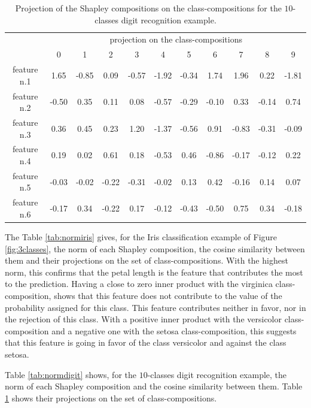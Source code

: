 \documentclass{article}
\theoremstyle{plain}
\theoremstyle{definition}
\theoremstyle{remark}
\begin{document}
\begin{table}
  \centering
  \caption{Projection of the Shapley compositions on the class-compositions for the $10$-classes digit recognition example.}
  \begin{tabular}{c|cccccccccc|}
    \cline{2-11}
    & \multicolumn{10}{c|}{projection on the class-compositions} \\
    \cline{2-11}
    & 0 & 1 & 2 & 3 & 4 & 5 & 6 & 7 & 8 & 9 \\
    \hline
    \small feature n.1 & 1.65 & -0.85 & 0.09 & -0.57 & -1.92 & -0.34 & 1.74 & 1.96 & 0.22 & -1.81 \\
    \small feature n.2 & -0.50 & 0.35 & 0.11 & 0.08 & -0.57 & -0.29 & -0.10 & 0.33 & -0.14 & 0.74\\
    \small feature n.3 & 0.36 & 0.45 & 0.23 & 1.20 & -1.37 & -0.56 & 0.91 & -0.83 & -0.31 & -0.09 \\
    \small feature n.4 & 0.19 & 0.02 & 0.61 & 0.18 & -0.53 & 0.46 & -0.86 & -0.17 & -0.12 & 0.22 \\
    \small feature n.5 & -0.03 & -0.02 & -0.22 & -0.31 & -0.02 & 0.13 & 0.42 & -0.16& 0.14 & 0.07 \\
    \small feature n.6 & -0.17 & 0.34 & -0.22 & 0.17 & -0.12 & -0.43 &-0.50  & 0.75 & 0.34 & -0.18 \\
    \hline
  \end{tabular}
  \label{tab:projdigit}
\end{table}
The Table \ref{tab:normiris} gives, for the Iris classification example of Figure \ref{fig:3classes}, the norm of each Shapley composition, the cosine similarity between them and their projections on the set of class-compositions. With the highest norm, this confirms that the petal length is the feature that contributes the most to the prediction. Having a close to zero inner product with the virginica class-composition, shows that this feature does not contribute to the value of the probability assigned for this class. This feature contributes neither in favor, nor in the rejection of this class. With a positive inner product with the versicolor class-composition and a negative one with the setosa class-composition, this suggests that this feature is going in favor of the class versicolor and against the class setosa.

Table \ref{tab:normdigit} shows, for the $10$-classes digit recognition example, the norm of each Shapley composition and the cosine similarity between them. Table \ref{tab:projdigit} shows their projections on the set of class-compositions.
\end{document}
